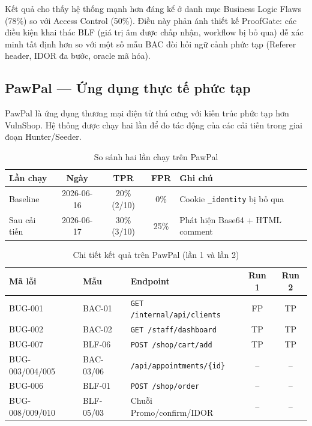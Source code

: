 Kết quả cho thấy hệ thống mạnh hơn đáng kể ở danh mục Business Logic Flaws (78\%) so với Access Control (50\%). Điều này phản ánh thiết kế ProofGate: các điều kiện khai thác BLF (giá trị âm được chấp nhận, workflow bị bỏ qua) dễ xác minh tất định hơn so với một số mẫu BAC đòi hỏi ngữ cảnh phức tạp (Referer header, IDOR đa bước, oracle mã hóa).

\subsection{PawPal --- Ứng dụng thực tế phức tạp}

PawPal là ứng dụng thương mại điện tử thú cưng với kiến trúc phức tạp hơn VulnShop. Hệ thống được chạy hai lần để đo tác động của các cải tiến trong giai đoạn Hunter/Seeder.

\begin{table}[h]
\centering
\renewcommand{\arraystretch}{1.3}
\caption{So sánh hai lần chạy trên PawPal}
\label{tab:pawpal_compare}
\begin{tabular}{|l|c|c|c|l|}
\hline
\textbf{Lần chạy} & \textbf{Ngày} & \textbf{TPR} & \textbf{FPR} & \textbf{Ghi chú} \\
\hline
Baseline & 2026-06-16 & 20\% (2/10) & 0\% & Cookie \texttt{\_identity} bị bỏ qua \\
\hline
Sau cải tiến & 2026-06-17 & 30\% (3/10) & 25\% & Phát hiện Base64 + HTML comment \\
\hline
\end{tabular}
\end{table}

\begin{table}[h]
\centering
\renewcommand{\arraystretch}{1.3}
\caption{Chi tiết kết quả trên PawPal (lần 1 và lần 2)}
\label{tab:pawpal_detail}
\begin{tabular}{|l|l|l|c|c|}
\hline
\textbf{Mã lỗi} & \textbf{Mẫu} & \textbf{Endpoint} & \textbf{Run 1} & \textbf{Run 2} \\
\hline
BUG-001 & BAC-01 & \texttt{GET /internal/api/clients} & FP & TP \\
\hline
BUG-002 & BAC-02 & \texttt{GET /staff/dashboard} & TP & TP \\
\hline
BUG-007 & BLF-06 & \texttt{POST /shop/cart/add} & TP & TP \\
\hline
BUG-003/004/005 & BAC-03/06 & \texttt{/api/appointments/\{id\}} & -- & -- \\
\hline
BUG-006 & BLF-01 & \texttt{POST /shop/order} & -- & -- \\
\hline
BUG-008/009/010 & BLF-05/03 & Chuỗi Promo/confirm/IDOR & -- & -- \\
\hline
\end{tabular}
\end{table}

